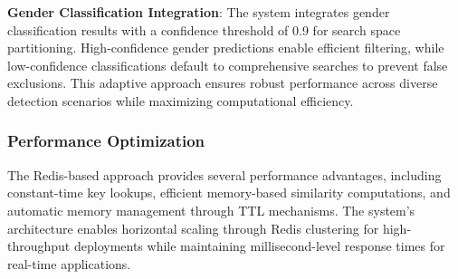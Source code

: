 \textbf{Gender Classification Integration}: The system integrates gender classification results with a confidence threshold of 0.9 for search space partitioning. High-confidence gender predictions enable efficient filtering, while low-confidence classifications default to comprehensive searches to prevent false exclusions. This adaptive approach ensures robust performance across diverse detection scenarios while maximizing computational efficiency.

\subsubsection{Performance Optimization}

The Redis-based approach provides several performance advantages, including constant-time key lookups, efficient memory-based similarity computations, and automatic memory management through TTL mechanisms. The system's architecture enables horizontal scaling through Redis clustering for high-throughput deployments while maintaining millisecond-level response times for real-time applications.